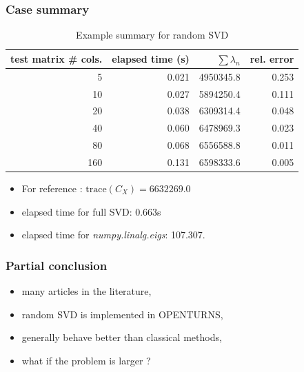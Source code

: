 \begin{frame}
\frametitle{Case summary}
\begin{table}[H]
\centering
\begin{tabular}{rrrr}
\hline
test matrix \# cols.  & elapsed time (s) &   $\sum \lambda_n$ & rel. error \\
\hline
               5 & 0.021            & 4950345.8          & 0.253      \\ 
              10 & 0.027            & 5894250.4          & 0.111      \\ 
              20 & 0.038            & 6309314.4          & 0.048      \\
              40 & 0.060            & 6478969.3          & 0.023      \\
              80 & 0.068            & 6556588.8          & 0.011      \\ 
             160 & 0.131            & 6598333.6          & 0.005      \\
\hline
\end{tabular}
\caption{Example summary for random SVD \label{tab:rSVD}}                
\end{table}

\begin{itemize}
  \item For reference : $\mathrm{trace}(C_X) = 6632269.0$
  \item elapsed time for full SVD: 0.663s
  \item elapsed time for \textit{numpy.linalg.eigs}: 107.307.
\end{itemize}
\end{frame}

\begin{frame}
\frametitle{Partial conclusion}
\begin{itemize}
  \item many articles in the literature,
  \item random SVD is implemented in OPENTURNS,
  \item generally behave better than classical methods,
  \item \alert{what if the problem is larger ?}
\end{itemize}
\end{frame}
